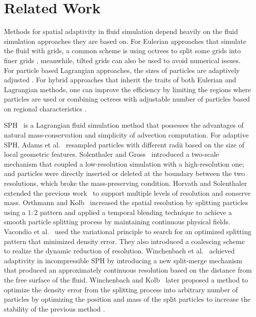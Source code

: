 \documentclass[VANCOUVER,STIX1COL]{WileyNJD-v2}
\begin{document}
\section{Related Work}
Methods for spatial adaptivity in fluid simulation depend heavily on the fluid simulation approaches they are based on. For Eulerian approaches that simulate the fluid with grids, a common scheme is using octrees to split some grids into finer grids \cite{Ando20}, meanwhile, tilted grids can also be used \cite{Xiao20} to avoid numerical issues. For particle based Lagrangian approaches, the sizes of particles are adaptively adjusted \cite{Winchenbach17}. For hybrid approaches that inherit the traits of both Eulerian and Lagrangian methods, one can improve the efficiency by limiting the regions where particles are used \cite{Sato18} or combining octrees with adjustable number of particles based on regional characteristics \cite{Nakanishi20}.

SPH~\cite{Koschier19} is a Lagrangian fluid simulation method that possesses the advantages of natural mass-conservation and simplicity of advection computation. For adaptive SPH, Adams et al.~\cite{Adams07} resampled particles with different radii based on the size of local geometric features. Solenthaler and Gross~\cite{Solenthaler11} introduced a two-scale mechanism that coupled a low-resolution simulation with a high-resolution one; and particles were directly inserted or deleted at the boundary between the two resolutions, which broke the mass-preserving condition. Horvath and Solenthaler~\cite{Horvath13} extended the previous work~\cite{Solenthaler11} to support multiple levels of resolution and conserve mass. Orthmann and Kolb~\cite{Orthmann12} increased the spatial resolution by splitting particles using a $1:2$ pattern and applied a temporal blending technique to achieve a smooth particle splitting process by maintaining continuous physical fields. Vacondio et al.~\cite{Vacondio16} used the variational principle to search for an optimized splitting pattern that minimized density error. They also introduced a coalescing scheme to realize the dynamic reduction of resolution. Winchenbach et al.~\cite{Winchenbach17} achieved adaptivity in incompressible SPH by introducing a new split-merge mechanism that produced an approximately continuous resolution based on the distance from the free surface of the fluid. Winchenbach and Kolb~\cite{Winchenbach21} later proposed a method to optimize the density error from the splitting process into arbitrary number of particles by optimizing the position and mass of the split particles to increase the stability of the previous method \cite{Winchenbach17}.
\end{document}
